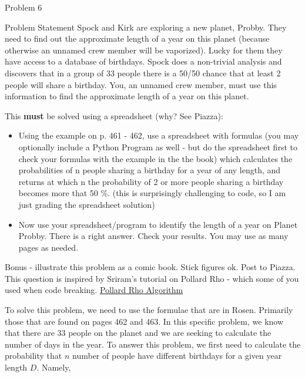 \begin{problem}{Problem 6}
    \begin{statement}{Problem Statement}
        Spock and Kirk are exploring a new planet, Probby. They need to find out the approximate length of a year on this planet (because otherwise an unnamed crew member will be vaporized). Lucky 
        for them they have access to a database of birthdays. Spock does a non-trivial analysis and discovers that in a group of 33 people there is a 50/50 chance that at least 2 people will share 
        a birthday. You, an unnamed crew member, must use this information to find the approximate length of a year on this planet. \vspace*{1em}

        This \textbf{must} be solved using a spreadsheet (why? See Piazza):

        \begin{itemize}
            \item Using the example on p. 461 - 462, use a spreadsheet with formulas (you may optionally include a Python Program as well - but do the spreadsheet first to check your formulas with 
            the example in the the book) which calculates the probabilities of n people sharing a birthday for a year of any length, and returns at which n the probability of 2 or more people sharing 
            a birthday becomes more that 50 \%. (this is surprisingly challenging to code, so I am just grading the spreadsheet solution)
            \item Now use your spreadsheet/program to identify the length of a year on Planet Probby. There is a right answer. Check your results. You may use as many pages as needed.
        \end{itemize}

        Bonus - illustrate this problem as a comic book. Stick figures ok. Post to Piazza. This question is inspired by Sriram's tutorial on Pollard Rho - which some of you used when code breaking. \href{https://home.cs.colorado.edu/%7Esrirams/courses/csci2824-spr14/pollardsRho.html}{Pollard Rho Algorithm}
    \end{statement}

    \begin{highlight}[Solution]
        To solve this problem, we need to use the formulae that are in Rosen. Primarily those that are found on pages 462 and 463. In this specific problem, we know that there are 33 people on the planet
        and we are seeking to calculate the number of days in the year. To answer this problem, we first need to calculate the probability that $n$ number of people have different birthdays for a given 
        year length $D$. Namely,


\end{highlight}
\end{problem}
